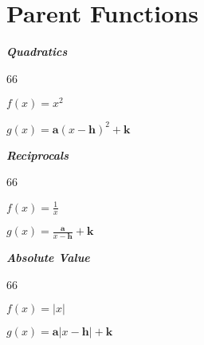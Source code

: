 \section{Parent Functions}

\vfil
{
    \begin{minipage}{0.2\textwidth}
        \begin{center}
            {\bfseries\itshape Quadratics}\\
            \begin{myTikzpictureGrid}{0.25} {6}{6}
            \end{myTikzpictureGrid}
        \end{center}\vspace{-1\onelineskip}
        {$f(x) = x^2$}

        {$g(x) = \bm{a}(x-\bm{h})^2 + \bm{k}$}
    \end{minipage}
}
\hfill 
{
    \begin{minipage}{0.2\textwidth}
        \begin{center}
            {\bfseries\itshape Reciprocals}\\
            \begin{myTikzpictureGrid}{0.25} {6}{6}
            \end{myTikzpictureGrid}
        \end{center}\vspace{-1\onelineskip}
        {$f(x) = \frac{1}{x}$}

        {$g(x) = \frac{\bm{a}}{x-\bm{h}} + \bm{k}$}
    \end{minipage}
}
\hfill
{
    \begin{minipage}{0.2\textwidth}
        \begin{center}
            {\bfseries\itshape Absolute Value}\\
            \begin{myTikzpictureGrid}{0.25} {6}{6}
            \end{myTikzpictureGrid}
        \end{center}\vspace{-1\onelineskip}
        {$f(x) = |x|$}

        {$g(x) = \bm{a}|x-\bm{h}| + \bm{k}$}
    \end{minipage}
}
